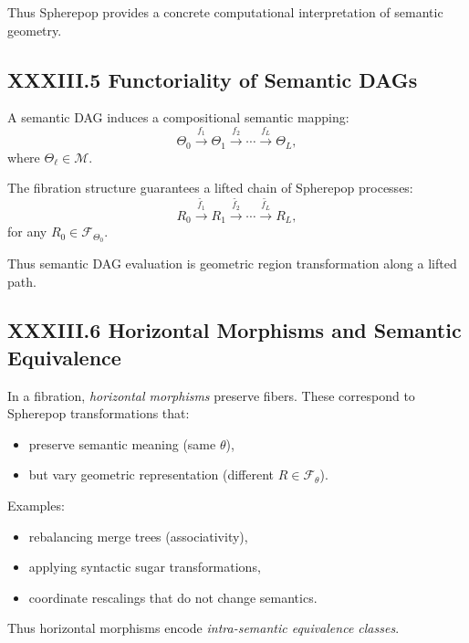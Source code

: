 \documentclass[12pt,letterpaper]{article}
\begin{document}
Thus Spherepop provides a concrete computational interpretation of semantic geometry.

\subsection{XXXIII.5 Functoriality of Semantic DAGs}

A semantic DAG induces a compositional semantic mapping:
\[
\Theta_0 \xrightarrow{f_1} \Theta_1 \xrightarrow{f_2} \cdots \xrightarrow{f_L} \Theta_L,
\]
where $\Theta_\ell \in \mathcal{M}$.

The fibration structure guarantees a lifted chain of Spherepop processes:
\[
R_0 \xrightarrow{\widetilde{f_1}} R_1 \xrightarrow{\widetilde{f_2}} \cdots \xrightarrow{\widetilde{f_L}} R_L,
\]
for any $R_0 \in \mathcal{F}_{\Theta_0}$.

Thus semantic DAG evaluation is geometric region transformation along a lifted path.

\subsection{XXXIII.6 Horizontal Morphisms and Semantic Equivalence}

In a fibration, \emph{horizontal morphisms} preserve fibers. These correspond to Spherepop transformations that:

\begin{itemize}
    \item preserve semantic meaning (same $\theta$),
    \item but vary geometric representation (different $R \in \mathcal{F}_\theta$).
\end{itemize}

Examples:

\begin{itemize}
    \item rebalancing merge trees (associativity),
    \item applying syntactic sugar transformations,
    \item coordinate rescalings that do not change semantics.
\end{itemize}

Thus horizontal morphisms encode \emph{intra-semantic equivalence classes}.
\end{document}
